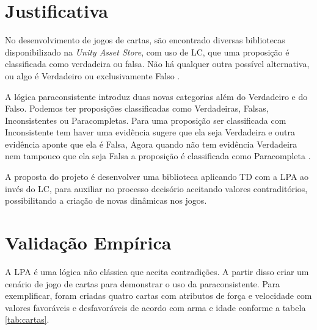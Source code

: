 \pagebreak

\section{Justificativa}

No desenvolvimento de jogos de cartas, são encontrado diversas bibliotecas disponibilizado na \textit{Unity Asset Store}, com uso de LC, que uma proposição é classificada como verdadeira ou falsa. Não há qualquer outra possível alternativa, ou algo é Verdadeiro ou exclusivamente Falso \cite{aspectos-lpa-2013}.

A lógica paraconsistente introduz duas novas categorias além do Verdadeiro e do Falso. Podemos ter proposições classificadas como Verdadeiras, Falsas, Inconsistentes ou Paracompletas. Para uma proposição ser classificada com Inconsistente tem haver uma evidência sugere que ela seja Verdadeira e outra evidência aponte que ela é Falsa, Agora quando não tem evidência Verdadeira nem tampouco que ela seja Falsa a proposição é classificada como Paracompleta \cite{aspectos-lpa-2013}.

A proposta do projeto é desenvolver uma biblioteca aplicando TD com a LPA ao invés
do LC, para auxiliar no processo decisório aceitando valores contraditórios, possibilitando a criação de novas dinâmicas nos jogos.



\section{Validação Empírica}

A LPA é uma lógica não clássica que aceita contradições. A partir disso criar um cenário de jogo de cartas para demonstrar o uso da
paraconsistente. Para exemplificar, foram criadas quatro cartas com atributos de força e velocidade com valores favoráveis e desfavoráveis de acordo com arma e idade conforme a tabela \ref{tab:cartas}.

